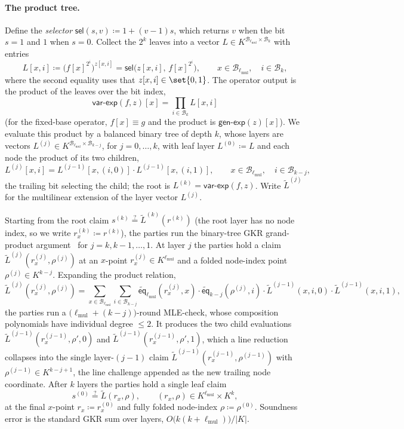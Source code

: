 \documentclass{article}
\theoremstyle{definition}
\newcommand*{\mle}{\widetilde}
\newcommand{\eq}{\mathsf{eq}}
\newcommand{\BB}{\mathcal{B}}
\newcommand{\sel}{\textsf{sel}}
\begin{document}
\paragraph{The product tree.}
Define the \emph{selector} $\sel(s, v) \coloneqq 1 + (v - 1) s$, which returns $v$ when the bit $s = 1$ and $1$ when $s = 0$. Collect the $2^k$ leaves into a vector $L \in K^{\BB_{\ell_\text{mul}} \times \BB_k}$ with entries
\[
  L[x, i] \coloneqq \bigl( f[x]^{2^i} \bigr)^{z[x, i]} = \sel\bigl( z[x, i],\, f[x]^{2^i} \bigr), \qquad x \in \BB_{\ell_\text{mul}}, \quad i \in \BB_k,
\]
where the second equality uses that $z[x, i] \in \set{0, 1}$. The operator output is the product of the leaves over the bit index,
\[
  \textsf{var-exp}(f, z)[x] = \prod_{i \in \BB_k} L[x, i]
\]
(for the fixed-base operator, $f[x] \equiv g$ and the product is $\textsf{gen-exp}(z)[x]$). We evaluate this product by a balanced binary tree of depth $k$, whose layers are vectors $L^{(j)} \in K^{\BB_{\ell_\text{mul}} \times \BB_{k - j}}$, for $j = 0, \ldots, k$, with leaf layer $L^{(0)} \coloneqq L$ and each node the product of its two children,
\[
  L^{(j)}[x, i] = L^{(j - 1)}[x, (i, 0)] \cdot L^{(j - 1)}[x, (i, 1)], \qquad x \in \BB_{\ell_\text{mul}}, \quad i \in \BB_{k - j},
\]
the trailing bit selecting the child; the root is $L^{(k)} = \textsf{var-exp}(f, z)$. Write $\mle{L}^{(j)}$ for the multilinear extension of the layer vector $L^{(j)}$.

Starting from the root claim $s^{(k)} \stackrel{?}{=} \mle{L}^{(k)}(r^{(k)})$ (the root layer has no node index, so we write $r_x^{(k)} \coloneqq r^{(k)}$), the parties run the binary-tree GKR grand-product argument~\cite{Thaler:2013aa} for $j = k, k - 1, \ldots, 1$. At layer $j$ the parties hold a claim $\mle{L}^{(j)}(r_x^{(j)}, \rho^{(j)})$ at an $x$-point $r_x^{(j)} \in K^{\ell_\text{mul}}$ and a folded node-index point $\rho^{(j)} \in K^{k - j}$. Expanding the product relation,
\[
  \mle{L}^{(j)}(r_x^{(j)}, \rho^{(j)}) = \sum_{x \in \BB_{\ell_\text{mul}}} \sum_{i \in \BB_{k - j}} \mle{\eq}_{\ell_\text{mul}}(r_x^{(j)}, x) \cdot \mle{\eq}_{k - j}(\rho^{(j)}, i) \cdot \mle{L}^{(j - 1)}(x, i, 0) \cdot \mle{L}^{(j - 1)}(x, i, 1),
\]
the parties run a $\bigl( \ell_\text{mul} + (k - j) \bigr)$-round MLE-check, whose composition polynomials have individual degree $\leq 2$. It produces the two child evaluations $\mle{L}^{(j - 1)}(r_x^{(j - 1)}, \rho', 0)$ and $\mle{L}^{(j - 1)}(r_x^{(j - 1)}, \rho', 1)$, which a line reduction~\cite{Goldwasser:2015aa} collapses into the single layer-$(j - 1)$ claim $\mle{L}^{(j - 1)}(r_x^{(j - 1)}, \rho^{(j - 1)})$ with $\rho^{(j - 1)} \in K^{k - j + 1}$, the line challenge appended as the new trailing node coordinate. After $k$ layers the parties hold a single leaf claim
\[
  s^{(0)} \stackrel{?}{=} \mle{L}(r_x, \rho), \qquad (r_x, \rho) \in K^{\ell_\text{mul}} \times K^k,
\]
at the final $x$-point $r_x \coloneqq r_x^{(0)}$ and fully folded node-index $\rho \coloneqq \rho^{(0)}$. Soundness error is the standard GKR sum over layers, $O\bigl( k(k + \ell_\text{mul}) \bigr) / |K|$.
\end{document}
